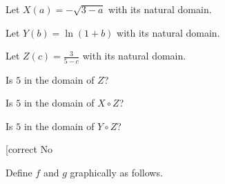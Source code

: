 \documentclass{ximera}
\begin{document}
\begin{example}


Let $X(a) = -\sqrt{3 - a}$ with its natural domain.


Let $Y(b) = \ln(1 + b)$ with its natural domain.


Let $Z(c) = \frac{3}{5 - c}$ with its natural domain.



\begin{question}

Is $5$ in the domain of $Z$?

\begin{multipleChoice}
\end{multipleChoice}

\end{question}





\begin{question}

Is $5$ in the domain of $X \circ Z$?

\begin{multipleChoice}
\end{multipleChoice}

\end{question}



\begin{question}

Is $5$ in the domain of $Y \circ Z$?

\begin{multipleChoice}
\choice [correct {No}
\end{multipleChoice}

\end{question}




\end{example}








Define $f$ and $g$ graphically as follows.
\end{document}
